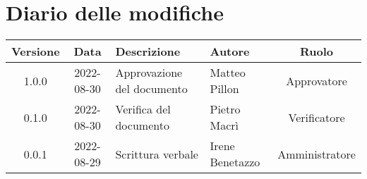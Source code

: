 \section*{Diario delle modifiche}
	\begin{center}
	\renewcommand{\arraystretch}{1.8} %
	\begin{tabular}{ |c|c|m{12em}|m{7em}|c| }
	\hline
	\textbf{Versione} & \textbf{Data} & \textbf{Descrizione} &  \textbf{Autore} &  \textbf{Ruolo} \\ %
	\hline
	1.0.0 & 2022-08-30 & Approvazione del documento & Matteo \newline Pillon & Approvatore\\
	\hline
	0.1.0 & 2022-08-30 & Verifica del documento & Pietro \newline Macrì & Verificatore\\
	\hline
    0.0.1 & 2022-08-29 & Scrittura verbale & Irene \newline Benetazzo & Amministratore\\ %
	\hline
	\end{tabular}
	\end{center}
	\newpage